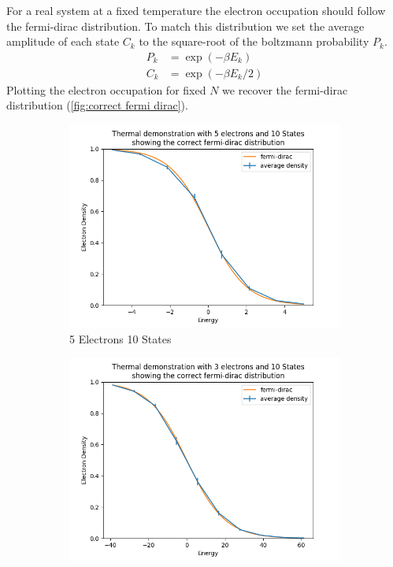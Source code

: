 For a real system at a fixed
temperature the electron occupation
should follow the fermi-dirac distribution.
To match this distribution we
set the average amplitude of
each state \(C_k\) to the
square-root of the boltzmann probability \(P_k\).
\begin{align}
    P_k & = \exp(-\beta{}E_k)     \\
    C_k & = \exp(-\beta{}E_k / 2)
\end{align}
Plotting the
electron occupation for fixed \(N\)
we recover the fermi-dirac
distribution (\cref{fig:correct fermi dirac}).
\begin{figure}[htbp]
    \centering
    \begin{subfigure}{0.45\linewidth}
        \centering
        \includegraphics[width =0.9 \linewidth]{Figures/Simulation/Plot of correct fermi dirac distribution on center.png}
        \caption{5 Electrons 10 States}
    \end{subfigure}
    \hfill
    \begin{subfigure}{0.45\linewidth}
        \centering
        \includegraphics[width = 0.9\linewidth]{Figures/Simulation/Plot of correct fermi dirac distribution off centre.png}

\end{subfigure}
\end{figure}
